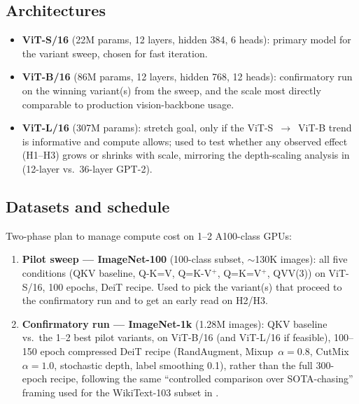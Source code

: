 \documentclass[11pt]{article}
\begin{document}
\subsection{Architectures}
\begin{itemize}
    \item \textbf{ViT-S/16} (22M params, 12 layers, hidden 384, 6 heads):
    primary model for the variant sweep, chosen for fast iteration.
    \item \textbf{ViT-B/16} (86M params, 12 layers, hidden 768, 12 heads):
    confirmatory run on the winning variant(s) from the sweep, and the
    scale most directly comparable to production vision-backbone usage.
    \item \textbf{ViT-L/16} (307M params): stretch goal, only if the
    ViT-S~$\to$~ViT-B trend is informative and compute allows; used to
    test whether any observed effect (H1--H3) grows or shrinks with
    scale, mirroring the depth-scaling analysis in
    \citet{kayyam2026three} (12-layer vs.\ 36-layer GPT-2).
\end{itemize}

\subsection{Datasets and schedule}
Two-phase plan to manage compute cost on 1--2 A100-class GPUs:
\begin{enumerate}
    \item \textbf{Pilot sweep --- ImageNet-100} (100-class subset,
    $\sim$130K images): all five conditions (QKV baseline, Q-K=V,
    Q=K-V\(^+\), Q=K=V\(^+\), QVV(3)) on ViT-S/16, 100 epochs, DeiT
    recipe. Used to pick the variant(s) that proceed to the confirmatory
    run and to get an early read on H2/H3.
    \item \textbf{Confirmatory run --- ImageNet-1k} (1.28M images): QKV
    baseline vs.\ the 1--2 best pilot variants, on ViT-B/16 (and ViT-L/16
    if feasible), 100--150 epoch compressed DeiT recipe (RandAugment,
    Mixup~$\alpha{=}0.8$, CutMix~$\alpha{=}1.0$, stochastic depth,
    label smoothing 0.1), rather than the full 300-epoch recipe, following
    the same ``controlled comparison over SOTA-chasing'' framing used for
    the WikiText-103 subset in \citet{kayyam2026three}.
\end{enumerate}
\end{document}
